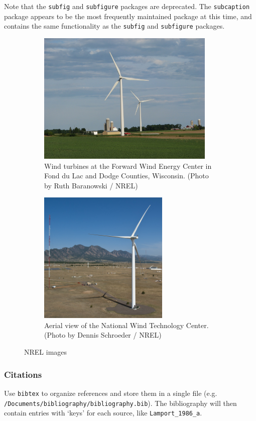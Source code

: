 Note that the \texttt{subfig} and \texttt{subfigure} packages are deprecated. The \texttt{subcaption} package appears to be the most frequently maintained package at this time, and contains the same functionality as the \texttt{subfig} and \texttt{subfigure} packages.

\begin{figure}
          \begin{subfigure}[b]{.55\linewidth}
            \centering
            \includegraphics[height=2.5in]{files/21206}
            \caption{Wind turbines at the Forward Wind Energy Center in Fond du Lac and Dodge Counties, Wisconsin. (Photo by Ruth Baranowski / NREL)}\label{fig:21206}
          \end{subfigure}%
          \begin{subfigure}[b]{.55\linewidth}
            \centering
            \includegraphics[height=2.5in]{files/20018}
            \caption{Aerial view of the National Wind Technology Center. (Photo by Dennis Schroeder / NREL)}\label{fig:20018}
          \end{subfigure}
          \caption{NREL images}\label{fig:NRELimages}
\end{figure}

\subsubsection{Citations}
\label{Sec:Bib}
Use \texttt{bibtex} to organize references and store them in a single file (e.g. \verb+/Documents/bibliography/bibliography.bib+). The bibliography will then contain entries with `keys' for each source, like \texttt{Lamport\_1986\_a}. 

